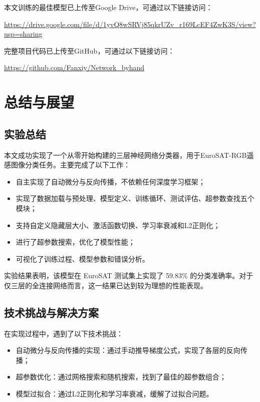 \documentclass[UTF8]{article}
\begin{document}
本文训练的最佳模型已上传至Google Drive，可通过以下链接访问：
\begin{center}
\url{https://drive.google.com/file/d/1yvQ8wSRVj85qkrUZv_r169LcEF4ZwK3S/view?usp=sharing}
\end{center}

完整项目代码已上传至GitHub，可通过以下链接访问：
\begin{center}
\url{https://github.com/Fanxiy/Network_byhand}
\end{center}
\section{总结与展望}
\subsection{实验总结}
本文成功实现了一个从零开始构建的三层神经网络分类器，用于EuroSAT-RGB遥感图像分类任务。主要完成了以下工作：
\begin{itemize}[topsep=0pt, partopsep=0pt, itemsep=0pt, parsep=0pt]
    \item 自主实现了自动微分与反向传播，不依赖任何深度学习框架；
    \item 实现了数据加载与预处理、模型定义、训练循环、测试评估、超参数查找五个模块；
    \item 支持自定义隐藏层大小、激活函数切换、学习率衰减和L2正则化；
    \item 进行了超参数搜索，优化了模型性能；
    \item 可视化了训练过程、模型参数和错误分析。
\end{itemize}
实验结果表明，该模型在 EuroSAT 测试集上实现了 59.83\% 的分类准确率。对于仅三层的全连接网络而言，这一结果已达到较为理想的性能表现。
\subsection{技术挑战与解决方案}
在实现过程中，遇到了以下技术挑战：
\begin{itemize}[topsep=0pt, partopsep=0pt, itemsep=0pt, parsep=0pt]
    \item 自动微分与反向传播的实现：通过手动推导梯度公式，实现了各层的反向传播；
    \item 超参数优化：通过网格搜索和随机搜索，找到了最佳的超参数组合；
    \item 模型过拟合：通过L2正则化和学习率衰减，缓解了过拟合问题。
\end{itemize}
\end{document}
